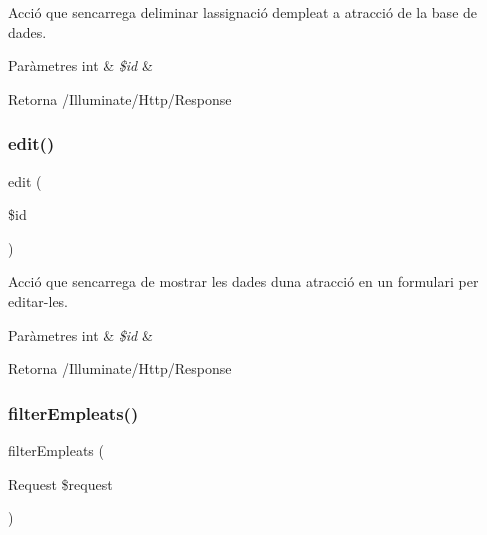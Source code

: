 Acció que s\textquotesingle{}encarrega d\textquotesingle{}eliminar l\textquotesingle{}assignació d\textquotesingle{}empleat a atracció de la base de dades.


\begin{DoxyParams}[1]{Paràmetres}
int & {\em \$id} & \\
\hline
\end{DoxyParams}
\begin{DoxyReturn}{Retorna}
/\+Illuminate/\+Http/\+Response 
\end{DoxyReturn}
\mbox{\label{class_app_1_1_http_1_1_controllers_1_1_atraccions_controller_a459ed16587e3a50b39b672c7e473abc5}} 
\subsubsection{\texorpdfstring{edit()}{edit()}}
{\footnotesize\ttfamily edit (\begin{DoxyParamCaption}\item[{}]{\$id }\end{DoxyParamCaption})}

Acció que s\textquotesingle{}encarrega de mostrar les dades d\textquotesingle{}una atracció en un formulari per editar-\/les.


\begin{DoxyParams}[1]{Paràmetres}
int & {\em \$id} & \\
\hline
\end{DoxyParams}
\begin{DoxyReturn}{Retorna}
/\+Illuminate/\+Http/\+Response 
\end{DoxyReturn}
\mbox{\label{class_app_1_1_http_1_1_controllers_1_1_atraccions_controller_a24cef5f7d055e7a8a2a174c3eb4e0aa4}} 
\subsubsection{\texorpdfstring{filter\+Empleats()}{filterEmpleats()}}
{\footnotesize\ttfamily filter\+Empleats (\begin{DoxyParamCaption}\item[{Request}]{\$request }\end{DoxyParamCaption})}

